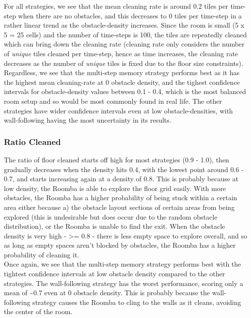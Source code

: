 \documentclass[11pt]{article}
\begin{document}
For all strategies, we see that the mean cleaning rate is around 0.2
tiles per time-step when there are no obstacles, and this decreases to 0
tiles per time-step in a rather linear trend as the obstacle-density
increases. Since the room is small (5 x 5 = 25 cells) and the number of
time-steps is 100, the tiles are repeatedly cleaned which can bring down
the cleaning rate (cleaning rate only considers the number of
\emph{unique} tiles cleaned per time-step, hence as time increases, the
cleaning rate decreases as the number of \emph{unique} tiles is fixed
due to the floor size constraints). Regardless, we see that the
multi-step memory strategy performs best as it has the highest mean
cleaning-rate at 0 obstacle density, and the tighest confidence
intervals for obstacle-density values between 0.1 - 0.4, which is the
most balanced room setup and so would be most commonly found in real
life. The other strategies have wider confidence intervals even at low
obstacle-densities, with wall-following having the most
uncertainty in its results.

\subsubsection*{Ratio Cleaned}

The ratio of floor cleaned starts off high for most strategies (0.9 -
1.0), then gradually decreases when the density hits 0.4, with the
lowest point around 0.6 - 0.7, and starts increasing again at a density
of 0.8. This is probably because at low density, the Roomba is able to
explore the floor grid easily. With more obstacles, the Roomba has a
higher probability of being stuck within a certain area either because
a) the obstacle layout sections of certain areas from being explored
(this is undesirable but does occur due to the random obstacle
distribution), or the Roomba is unable to find the exit. When the
obstacle density is very high - \textgreater{}= 0.8 - there is less
empty space to explore overall, and so as long as empty spaces aren't
blocked by obstacles, the Roomba has a higher probability of cleaning
it.\\

Once again, we see that the multi-step memory strategy performs best
with the tightest confidence intervals at low obstacle density compared
to the other strategies. The wall-following strategy has the worst
performance, scoring only a mean of \textasciitilde{}0.7 even at 0
obstacle density. This is probably because the wall-following strategy
causes the Roomba to cling to the walls as it cleans, avoiding the
center of the room.
\end{document}
